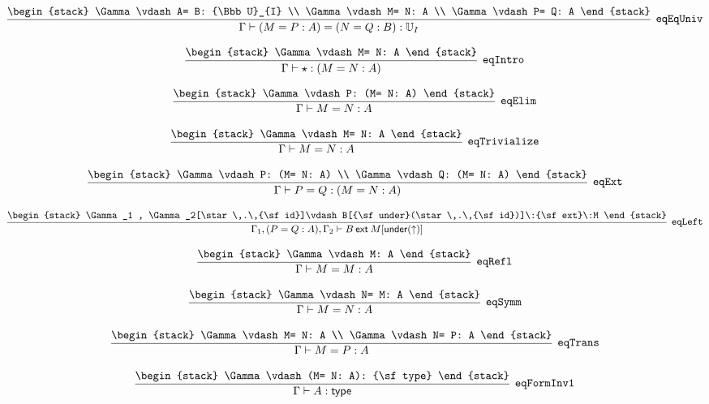 \[
\infer[{\tt eqEqUniv}]{\Gamma \vdash (M= P: A)= (N= Q: B): {\Bbb U}_{I}}{
\begin{stack}
\Gamma \vdash A= B: {\Bbb U}_{I}
\\
\Gamma \vdash M= N: A
\\
\Gamma \vdash P= Q: A
\end{stack}}
\]

\[
\infer[{\tt eqIntro}]{\Gamma \vdash \star : (M= N: A)}{
\begin{stack}
\Gamma \vdash M= N: A
\end{stack}}
\]

\[
\infer[{\tt eqElim}]{\Gamma \vdash M= N: A}{
\begin{stack}
\Gamma \vdash P: (M= N: A)
\end{stack}}
\]

\[
\infer[{\tt eqTrivialize}]{\Gamma \vdash M= N: A}{
\begin{stack}
\Gamma \vdash M= N: A
\end{stack}}
\]

\[
\infer[{\tt eqExt}]{\Gamma \vdash P= Q: (M= N: A)}{
\begin{stack}
\Gamma \vdash P: (M= N: A)
\\
\Gamma \vdash Q: (M= N: A)
\end{stack}}
\]

\[
\infer[{\tt eqLeft}]{\Gamma_1 ,(P= Q: A), \Gamma_2 \vdash B\:{\sf ext}\:M[{\sf under}(\uparrow )]}{
\begin{stack}
\Gamma_1 , \Gamma_2[\star \,.\,{\sf id}]\vdash B[{\sf under}(\star \,.\,{\sf id})]\:{\sf ext}\:M
\end{stack}}
\]

\[
\infer[{\tt eqRefl}]{\Gamma \vdash M= M: A}{
\begin{stack}
\Gamma \vdash M: A
\end{stack}}
\]

\[
\infer[{\tt eqSymm}]{\Gamma \vdash M= N: A}{
\begin{stack}
\Gamma \vdash N= M: A
\end{stack}}
\]

\[
\infer[{\tt eqTrans}]{\Gamma \vdash M= P: A}{
\begin{stack}
\Gamma \vdash M= N: A
\\
\Gamma \vdash N= P: A
\end{stack}}
\]

\[
\infer[{\tt eqFormInv1}]{\Gamma \vdash A: {\sf type}}{
\begin{stack}
\Gamma \vdash (M= N: A): {\sf type}
\end{stack}}
\]

